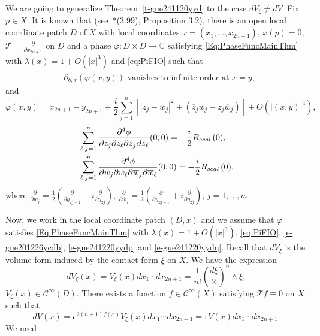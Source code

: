 \documentclass[12pt]{amsart}
\theoremstyle{definition}
\theoremstyle{named}
\numberwithin{equation}{subsection}
\newcommand{\ol}{\overline}
\newcommand{\C}{\mathbb{C}}
\newcommand{\ddbar}{\overline\partial}
\newcommand{\pr}{\partial}
\newcommand{\abs}[1]{\left\vert#1\right\vert}
\def\cC{\mathscr{C}}
\begin{document}
We are going to generalize Theorem~\ref{t-gue241120yyd} to the case $dV_\xi\neq dV$. Fix $p\in X$. It is known that (see~\cite{Hsiao_Shen_2nd_coefficient_BS_2020}*{(3.99), Proposition 3.2}), there is an open local coordinate patch $D$ of $X$ with local coordinates $x=(x_1,\ldots,x_{2n+1})$, $x(p)=0$, $\mathcal{T}=\frac{\pr}{\pr x_{2n+1}}$ on $D$ and a phase $\varphi:D\times D\to\C$ satisfying 
\eqref{Eq:PhaseFuncMainThm} with $\lambda(x)=1+O(\abs{x}^3)$ and \eqref{eq:PiFIO} such that 
\begin{equation}\label{e-gue201226ycdb}
\begin{split}
&\mbox{$\ddbar_{b,x}(\varphi(x,y))$ vanishes to infinite order at $x=y$},
\end{split}
\end{equation}
and 
\begin{equation}\label{e-gue241220yydp}
\varphi(x,y)=x_{2n+1}-y_{2n+1}+\frac{i}{2}\sum_{j=1}^n\left[|z_j-w_j|^2+(\overline{z}_jw_j-z_j\overline{w}_j)\right]+O\left(|(x,y)|^4\right), 
\end{equation}
\begin{equation}\label{e-gue241220yydq}
\begin{split}
&\sum^n_{\ell,j=1}\frac{\pr^4\phi}{\pr z_j\pr z_\ell\pr\ol z_j\pr\ol z_\ell}(0,0)=
-\frac{i}{2}R_{{\rm scal\,}}(0),\\
&\sum^n_{\ell,j=1}\frac{\pr^4\phi}{\pr w_j\pr w_\ell\pr\ol w_j\pr\ol w_\ell}(0,0)=-\frac{i}{2}R_{{\rm scal\,}}(0),
\end{split}
\end{equation}
where $\frac{\pr}{\pr w_j}=\frac{1}{2}(\frac{\pr}{\pr y_{2j-1}}-i\frac{\pr}{\pr y_{2j}})$, $\frac{\pr}{\pr\ol w_j}=\frac{1}{2}(\frac{\pr}{\pr y_{2j-1}}+i\frac{\pr}{\pr y_{2j}})$, $j=1,\ldots,n$. 

Now, we work in the local coordinate patch $(D,x)$ and we assume that $\varphi$ satisfies \eqref{Eq:PhaseFuncMainThm} with $\lambda(x)=1+O(\abs{x}^3)$, \eqref{eq:PiFIO}, \eqref{e-gue201226ycdb}, \eqref{e-gue241220yydp} and \eqref{e-gue241220yydq}. 
Recall that $dV_\xi$ is the volume form induced by the contact form $\xi$ on $X$. We have the expression 
$$dV_\xi(x)=V_\xi(x)dx_1\cdots dx_{2n+1}=\frac{1}{n!}\left(\frac{d\xi}{2}\right)^n\wedge\xi,$$ $V_\xi(x)\in\cC^\infty(D)$. There exists a function $f\in\cC^\infty(X)$ satisfying $\mathcal{T}f\equiv 0$ on $X$ such that 
\begin{equation}\label{eqn:relation_two_volumes}
dV(x)=e^{2(n+1)f(x)}V_\xi(x) dx_1\cdots dx_{2n+1}=:V(x)dx_1\cdots dx_{2n+1}.
\end{equation}
We need 
\end{document}
